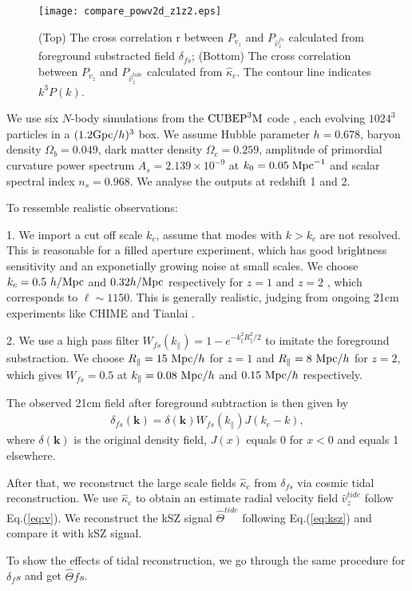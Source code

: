 \begin{figure}[tbp]
\begin{center}
\texttt{[image: compare\_powv2d\_z1z2.eps]}
\end{center}
\vspace{-0.7cm}
\caption{(Top) The cross correlation r between $P_{v_z}$ and 
    $P_{\hat v_z^{fs}}$ calculated from foreground substracted field $\delta_{fs}$; 
    (Bottom) The cross correlation between $P_{v_z}$ and $P_{\hat v_z^{tide}}$ calculated from $\hat \kappa_c$. 
The contour line indicates $k^3 P(k)$.
}
\label{fig:v}
\end{figure}
We use six $N$-body simulations from the
$\mathrm{CUBEP}^3\mathrm{M}$ code \cite{2013:code}, each evolving $1024^3$ particles in a $(1.2\mathrm{Gpc}/h)^3$ box. 
We assume Hubble parameter $h=0.678$, baryon
density $\Omega_{b}=0.049$, dark matter density $\Omega_{c}=0.259$,
amplitude of primordial curvature power spectrum $A_s=2.139\times10^{-9}$ at 
$k_0=0.05\;\mathrm{Mpc}^{-1}$ and scalar spectral index $n_s=0.968$.
We analyse the outputs at redshift 1 and 2.

To ressemble realistic observations:

1. We import a cut off scale $k_c$, assume that modes with $k>k_c$ are not resolved.
This is reasonable for a filled aperture experiment, which
has good brightness sensitivity and an exponetially growing noise at small 
scales.
We choose $k_c=0.5\ h/\mr{Mpc}$ and $0.32 h/\mathrm{Mpc}$ respectively for $z=1$ and $z=2$ , which corresponds
to $\ell\sim1150$. 
This is generally realistic, judging from ongoing 21cm experiments like
CHIME \cite{2014SPIE.9145E..22B}\cite{2014SPIE.9145E..4VN}
and Tianlai \cite{2012IJMPS..12..256C}\cite{2015ApJ...798...40X}.

2. We use a high pass filter $W_{fs}(k_\parallel)=1-e^{-k_\parallel^2R_\parallel^2/2}$ to imitate the foreground substraction. 
We choose 
$R_\parallel=15\ \mathrm{Mpc}/h$ for $z=1$ and $R_\parallel=8\ \mathrm{Mpc}/h$ for $z=2$, which gives
$W_{fs}=0.5$ at
$k_\parallel=0.08\ \mathrm{Mpc}/h$ and $0.15\ \mathrm{Mpc}/h$ respectively. 

The observed 21cm field after foreground subtraction is then given by 
\begin{eqnarray}
\label{eq:fs}
\delta_{fs}(\bm{k})=\delta(\bm{k})W_{fs}(k_\parallel)J(k_c-k),
\end{eqnarray}
where $\delta(\bm{k})$ is the original density field, 
$J(x)$ equals 0 for $x<0$ and equals 1 elsewhere.

After that, we reconstruct the large scale fields $\hat \kappa_c$ from $\delta_{fs}$ via
cosmic tidal reconstruction. 
We use $\hat \kappa_c$ to obtain an estimate radial velocity field $\hat v_z^{tide}$ follow Eq.(\ref{eq:v}).
We reconstruct the kSZ signal $\hat \Theta^{tide}$ following Eq.(\ref{eq:ksz}) and compare it with kSZ signal.

To show the effects of tidal reconstruction, we go through the same procedure for $\delta_fs$ and get $\hat \Theta{fs}$. 

